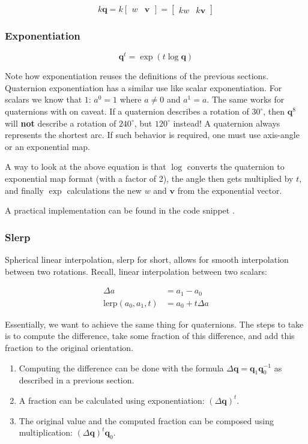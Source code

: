 \documentclass[a4paper,11pt]{article}
\begin{document}
$$k\textbf{q}=k\begin{bmatrix}w & \textbf{v}\end{bmatrix}=
\begin{bmatrix}kw & k\textbf{v}\end{bmatrix}$$

\subsubsection{Exponentiation}

$$\textbf{q}^t=\exp(t\log\textbf{q})$$

Note how exponentiation reuses the definitions of the previous sections. Quaternion exponentiation has a similar use like scalar exponentiation. For scalars we know that $1$: $a^0=1$ where $a \neq 0$ and $a^1=a$. The same works for quaternions with on caveat. If a quaternion describes a rotation of $30^\circ$, then $\textbf{q}^8$ will \textbf{not} describe a rotation of $240^\circ$, but $120^\circ$ instead! A quaternion always represents the shortest arc. If such behavior is required, one must use axis-angle or an exponential map.

A way to look at the above equation is that $\log$ converts the quaternion to exponential map format (with a factor of 2), the angle then gets multiplied by $t$, and finally $\exp$ calculations the new $w$ and $\textbf{v}$ from the exponential vector.

A practical implementation can be found in the code snippet .

\subsubsection{Slerp}

Spherical linear interpolation, slerp for short, allows for smooth interpolation between two rotations. Recall, linear interpolation between two scalars:

\begin{align*}
\Delta a &= a_1 - a_0 \\
\text{lerp}(a_0, a_1, t) &= a_0 + t \Delta a
\end{align*}

Essentially, we want to achieve the same thing for quaternions. The steps to take is to compute the difference, take some fraction of this difference, and add this fraction to the original orientation.

\begin{enumerate}
	\item Computing the difference can be done with the formula $\Delta \textbf{q} = \textbf{q}_1\textbf{q}_0^{-1}$ as described in a previous section.
	\item A fraction can be calculated using exponentiation: $(\Delta \textbf{q})^t$.
	\item The original value and the computed fraction can be composed using multiplication: $(\Delta \textbf{q})^t\textbf{q}_0$.
\end{enumerate}
\end{document}
